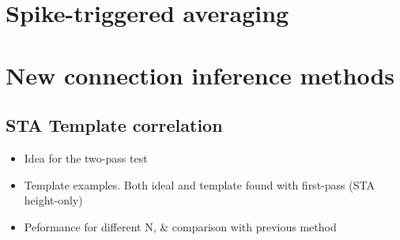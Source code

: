 \documentclass[a4paper, oneside, 11pt]{memoir}
\begin{document}


\chapter{Spike-triggered averaging}
\label{ch:STA}





\chapter{New connection inference methods}

\section{STA Template correlation}

\begin{itemize}
    \item Idea for the two-pass test
    \item Template examples. Both ideal and template found with first-pass (STA height-only)
    \item Peformance for different N, \& comparison with previous method
\end{itemize}
\end{document}
